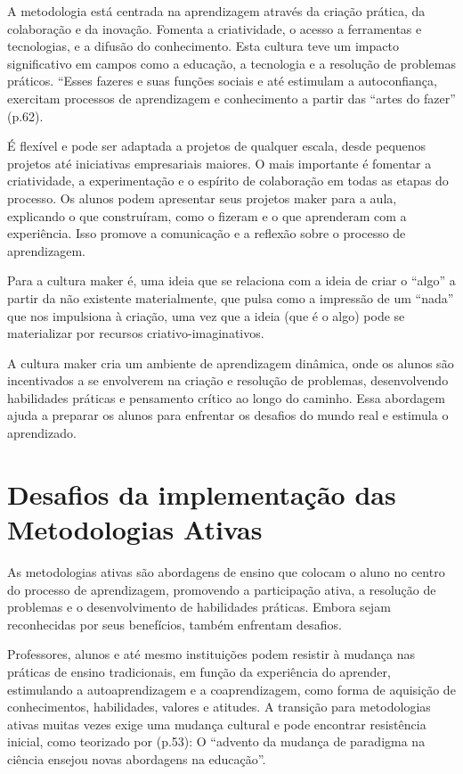 A metodologia está centrada na aprendizagem através da criação prática, da colaboração e da inovação. Fomenta a criatividade, o acesso a ferramentas e tecnologias, e a difusão do conhecimento. Esta cultura teve um impacto significativo em campos como a educação, a tecnologia e a resolução de problemas práticos. ``Esses fazeres e suas funções sociais e até estimulam a autoconfiança, exercitam processos de aprendizagem e conhecimento a partir das ``artes do fazer'' \cite{CABRAL2021} (p.62).

É flexível e pode ser adaptada a projetos de qualquer escala, desde pequenos projetos até iniciativas empresariais maiores. O mais importante é fomentar a criatividade, a experimentação e o espírito de colaboração em todas as etapas do processo. Os alunos podem apresentar seus projetos maker para a aula, explicando o que construíram, como o fizeram e o que aprenderam com a experiência. Isso promove a comunicação e a reflexão sobre o processo de aprendizagem.

Para  a cultura maker é, uma ideia que se relaciona com a ideia de criar o ``algo'' a partir da não existente materialmente, que pulsa como a impressão de um ``nada'' que nos impulsiona à criação, uma vez que a ideia (que é o algo) pode se materializar por recursos criativo-imaginativos.

A cultura maker cria um ambiente de aprendizagem dinâmica, onde os alunos são incentivados a se envolverem na criação e resolução de problemas, desenvolvendo habilidades práticas e pensamento crítico ao longo do caminho. Essa abordagem ajuda a preparar os alunos para enfrentar os desafios do mundo real e estimula o aprendizado.

\section{Desafios da implementação das Metodologias Ativas}

As metodologias ativas são abordagens de ensino que colocam o aluno no centro do processo de aprendizagem, promovendo a participação ativa, a resolução de problemas e o desenvolvimento de habilidades práticas. Embora sejam reconhecidas por seus benefícios, também enfrentam desafios.

Professores, alunos e até mesmo instituições podem resistir à mudança nas práticas de ensino tradicionais, em função da experiência do aprender, estimulando a autoaprendizagem e a coaprendizagem, como forma de aquisição de conhecimentos, habilidades, valores e atitudes.  A transição para metodologias ativas muitas vezes exige uma mudança cultural e pode encontrar resistência inicial, como teorizado por  (p.53): O ``advento da mudança de paradigma na ciência ensejou novas abordagens na educação''.

